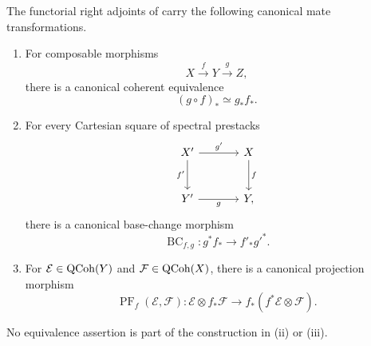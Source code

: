 \begin{proposition}
\label{prop:qcoh-canonical-mates}
The functorial right adjoints of  carry the following
canonical mate transformations.
\begin{enumerate}[label=(\roman*)]
    \item For composable morphisms
    \[
        X\xrightarrow{f}Y\xrightarrow{g}Z,
    \]
    there is a canonical coherent equivalence
    \[
        (g\circ f)_*
        \simeq
        g_*f_*.
    \]

    \item For every Cartesian square of spectral prestacks
    \[
    \begin{tikzcd}[column sep=large, row sep=large]
        X' \arrow[r, "g'"] \arrow[d, "f'"']
            & X \arrow[d, "f"] \\
        Y' \arrow[r, "g"']
            & Y,
    \end{tikzcd}
    \]
    there is a canonical base-change morphism
    \[
        \operatorname{BC}_{f,g}:
        g^*f_*
        \longrightarrow
        f'_*g'^*.
    \]

    \item For \(\mathcal E\in\operatorname{QCoh}(Y)\) and
    \(\mathcal F\in\operatorname{QCoh}(X)\), there is a canonical projection morphism
    \[
        \operatorname{PF}_{f}(\mathcal E,\mathcal F):
        \mathcal E\otimes f_*\mathcal F
        \longrightarrow
        f_*(f^*\mathcal E\otimes\mathcal F).
    \]
\end{enumerate}
No equivalence assertion is part of the construction in \textup{(ii)} or
\textup{(iii)}.
\end{proposition}

